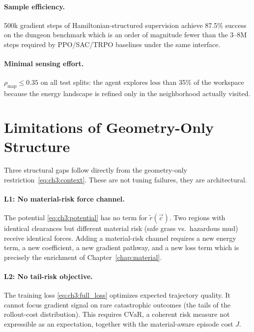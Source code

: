 \paragraph{Sample efficiency.}
500k gradient steps of Hamiltonian-structured supervision achieve
87.5\% success on the dungeon benchmark which is an order of magnitude
fewer than the 3--8M steps required by PPO/SAC/TRPO baselines
under the same interface.

\paragraph{Minimal sensing effort.}
$\rho_{\mathrm{map}} \leq 0.35$ on all test splits: the agent
explores less than 35\% of the workspace because the energy landscape
is refined only in the neighborhood actually visited.

\section{Limitations of Geometry-Only Structure}
\label{sec:ch3:limitations}

Three structural gaps follow directly from the geometry-only
restriction~\eqref{eq:ch3:context}.
These are not tuning failures, they are architectural.

\paragraph{L1: No material-risk force channel.}
The potential \eqref{eq:ch3:potential} has no term for $\tilde{r}(\vec{c})$.
Two regions with identical clearances but different material risk
(safe grass vs.\ hazardous mud) receive identical forces.
Adding a material-risk channel requires a new energy term, a new
coefficient, a new gradient pathway, and a new loss term which is 
precisely the enrichment of Chapter~\ref{chap:material}.

\paragraph{L2: No tail-risk objective.}
The training loss \eqref{eq:ch3:full_loss} optimizes expected
trajectory quality.
It cannot focus gradient signal on rare catastrophic outcomes
(the tails of the rollout-cost distribution).
This requires CVaR, a coherent risk measure not expressible as
an expectation, together with the material-aware episode cost $J$.

